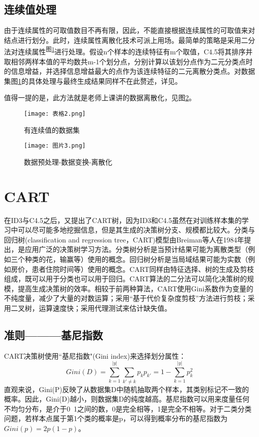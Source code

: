 \documentclass[fontset=windows]{article}
\begin{document}
\subsection{连续值处理}

由于连续属性的可取值数目不再有限，因此，不能直接根据连续属性的可取值来对结点进行划分。此时，连续属性离散化技术可派上用场。最简单的策略是采用二分法对连续属性\textsuperscript{图\ref{fig:7}}进行处理。假设n个样本的连续特征有m个取值，C4.5将其排序并取相邻两样本值的平均数共m-1个划分点，分别计算以该划分点作为二元分类点时的信息增益，并选择信息增益最大的点作为该连续特征的二元离散分类点。对数据集图\ref{fig:7}的具体处理与最终生成结果同样不在此赘述，详见\cite[机器学习]{ref5}。

值得一提的是，此方法就是老师上课讲的数据离散化，见图\ref{fig:3}。

\begin{figure}[h]
\centering
\caption{\label{fig:7}有连续值的数据集}
\texttt{[image: 表格2.png]}
\end{figure}

\begin{figure}[h]
\centering
\texttt{[image: 图片3.png]}
\caption{\label{fig:3}数据预处理-数据变换-离散化}
\end{figure}

\section{CART}

在ID3与C4.5之后，又提出了CART树，因为ID3和C4.5虽然在对训练样本集的学习中可以尽可能多地挖掘信息，但是其生成的决策树分支、规模都比较大。分类与回归树(classification and regression tree，CART)\cite[Breimanetal., 1984]{ref3}模型由Breiman等人在1984年提出，是应用广泛的决策树学习方法。分类树分析是当预计结果可能为离散类型（例如三个种类的花，输赢等）使用的概念。回归树分析是当局域结果可能为实数（例如房价，患者住院时间等）使用的概念。CART同样由特征选择、树的生成及剪枝组成，既可以用于分类也可以用于回归。CART算法的二分法可以简化决策树的规模，提高生成决策树的效率。相较于前两种算法，CART使用Gini系数作为变量的不纯度量，减少了大量的对数运算；采用“基于代价复杂度剪枝”方法进行剪枝；采用二叉树，运算速度快；采用代理测试来估计缺失值。

\subsection{准则———基尼指数}

CART决策树使用“基尼指数"(Gini index)来选择划分属性：$$Gini(D)=\sum_{k=1}^{|y|}\sum_{k'\neq k}p_kp_{k'}=1-\sum_{k=1}^{|y|}p_k^2$$直观来说，Gini(P)反映了从数据集D中随机抽取两个样本，其类别标记不一致的概率。因此，Gini(D)越小，则数据集D的纯度越高。基尼指数可以用来度量任何不均匀分布，是介于0~1之间的数，0是完全相等，1是完全不相等。对于二类分类问题，若样本点属于第1个类的概率是p，可以得到概率分布的基尼指数为$Gini(p)=2p(1-p)$。
\end{document}
